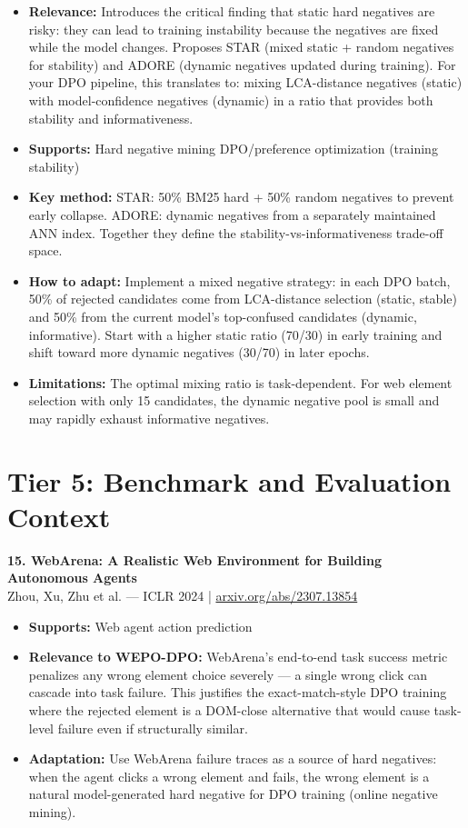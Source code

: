 \documentclass[pdflatex,sn-mathphys-num]{sn-jnl}
\theoremstyle{thmstyleone}
\theoremstyle{thmstyletwo}
\theoremstyle{thmstylethree}
\begin{document}
\begin{itemize}
    \item \textbf{Relevance:} Introduces the critical finding that static hard negatives are risky: they can lead to training instability because the negatives are fixed while the model changes. Proposes STAR (mixed static + random negatives for stability) and ADORE (dynamic negatives updated during training). For your DPO pipeline, this translates to: mixing LCA-distance negatives (static) with model-confidence negatives (dynamic) in a ratio that provides both stability and informativeness.
    \item \textbf{Supports:} \checkmark Hard negative mining \checkmark DPO/preference optimization (training stability)
    \item \textbf{Key method:} STAR: 50\% BM25 hard + 50\% random negatives to prevent early collapse. ADORE: dynamic negatives from a separately maintained ANN index. Together they define the stability-vs-informativeness trade-off space.
    \item \textbf{How to adapt:} Implement a mixed negative strategy: in each DPO batch, 50\% of rejected candidates come from LCA-distance selection (static, stable) and 50\% from the current model's top-confused candidates (dynamic, informative). Start with a higher static ratio (70/30) in early training and shift toward more dynamic negatives (30/70) in later epochs.
    \item \textbf{Limitations:} The optimal mixing ratio is task-dependent. For web element selection with only 15 candidates, the dynamic negative pool is small and may rapidly exhaust informative negatives.
\end{itemize}

\section{Tier 5: Benchmark and Evaluation Context}

\textbf{15. WebArena: A Realistic Web Environment for Building Autonomous Agents} \\
Zhou, Xu, Zhu et al. --- ICLR 2024 | \href{https://arxiv.org/abs/2307.13854}{arxiv.org/abs/2307.13854}

\begin{itemize}
    \item \textbf{Supports:} \checkmark Web agent action prediction
    \item \textbf{Relevance to WEPO-DPO:} WebArena's end-to-end task success metric penalizes any wrong element choice severely --- a single wrong click can cascade into task failure. This justifies the exact-match-style DPO training where the rejected element is a DOM-close alternative that would cause task-level failure even if structurally similar.
    \item \textbf{Adaptation:} Use WebArena failure traces as a source of hard negatives: when the agent clicks a wrong element and fails, the wrong element is a natural model-generated hard negative for DPO training (online negative mining).
\end{itemize}
\end{document}
